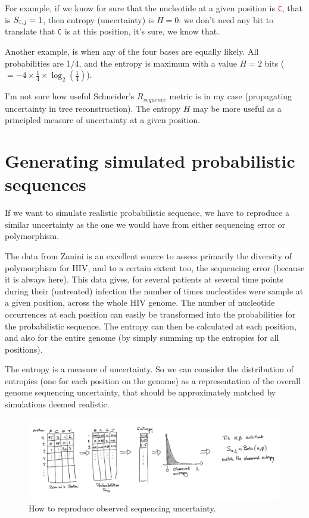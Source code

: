 \documentclass[12pt]{article}
\newcommand{\sq}[1]{\texttt{\textcolor{brown}{#1}}}
\begin{document}
For example, if we know for sure that the nucleotide at a given position is \sq{C}, that is $S_{\sq{C},j}=1$, then entropy (uncertainty) is $H=0$: we don't need any bit to translate that \sq{C} is at this position, it's sure, we know that. 

Another example, is when any of the four bases are equally likely. All probabilities are 1/4, and the entropy is maximum with a value $H = 2$ bits ($=-4\times \frac{1}{4}\times \log_2(\frac{1}{4})$). 
  
I'm not sure how useful Schneider's $R_{sequence}$ metric is in my case (propagating uncertainty in tree reconstruction).
The entropy $H$ may be more useful as a principled measure of uncertainty at a given position. 
 
 
\section{Generating simulated probabilistic sequences} 

If we want to simulate realistic probabilistic sequence, we have to reproduce a similar uncertainty as the one we would have from either sequencing error or polymorphism. 

The data from Zanini \cite{Zanini:2015} is an excellent source to assess primarily the diversity of polymorphism for HIV, and to a certain extent too, the sequencing error (because it is always here). 
This data gives, for several patients at several time points during their (untreated) infection the number of times nucleotides were sample at a given position, across the whole HIV genome. 
The number of nucleotide occurrences at each position can easily be transformed into the probabilities for the probabilistic sequence. The entropy can then be calculated at each position, and also for the entire genome (by simply summing up the entropies for all positions). 

The entropy is a measure of uncertainty. So we can consider the distribution of entropies (one for each position on the genome) as a representation of the overall genome sequencing uncertainty, that should be approximately matched by simulations deemed realistic. 


\begin{figure}[H]
\begin{center}
 \includegraphics[width = 0.99\textwidth]{figs/fit-entropy-beta.png}
\caption{How to reproduce observed sequencing uncertainty. }
\label{fig:fitentropybeta}
\end{center}
\end{figure}
\end{document}
